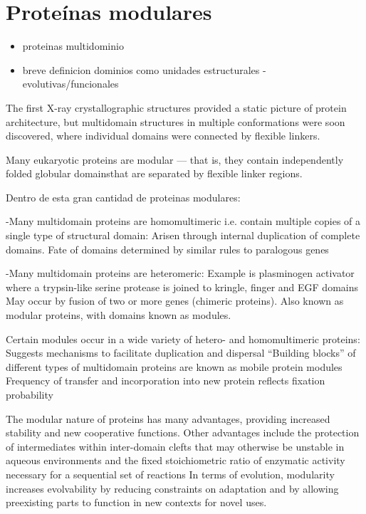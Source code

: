 \section{Proteínas modulares}
\begin{itemize}
 \item proteinas multidominio
 \item breve definicion dominios como unidades estructurales - evolutivas/funcionales
\end{itemize}



The first X-ray crystallographic structures provided a static picture of protein architecture, but multidomain structures in multiple conformations were soon discovered, where individual domains were connected by flexible linkers.

Many eukaryotic proteins are modular — that is, they contain independently folded globular domainsthat are separated by flexible linker regions. 

Dentro de esta gran cantidad de proteinas modulares:

-Many multidomain proteins are homomultimeric i.e. contain multiple copies of a single type of structural domain: Arisen through internal duplication of complete domains. Fate of domains determined by similar rules to paralogous genes

-Many multidomain proteins are heteromeric: Example is plasminogen activator where a trypsin-like serine protease is joined to kringle, finger and EGF domains
May occur by fusion of two or more genes (chimeric proteins). Also known as modular proteins, with domains known as modules. 

Certain modules occur in a wide variety of hetero- and homomultimeric proteins:
Suggests mechanisms to facilitate duplication and dispersal
“Building blocks” of different types of multidomain proteins are known as mobile protein modules
Frequency of transfer and incorporation into new protein reflects fixation probability


The modular nature of proteins has many advantages, providing increased stability and new cooperative functions.
Other advantages include the protection of intermediates within inter-domain clefts that may otherwise be unstable in aqueous environments and the fixed stoichiometric ratio of enzymatic activity necessary for a sequential set of reactions
In terms of evolution, modularity increases evolvability by reducing constraints on adaptation and by allowing preexisting parts to function in new contexts for novel uses.

